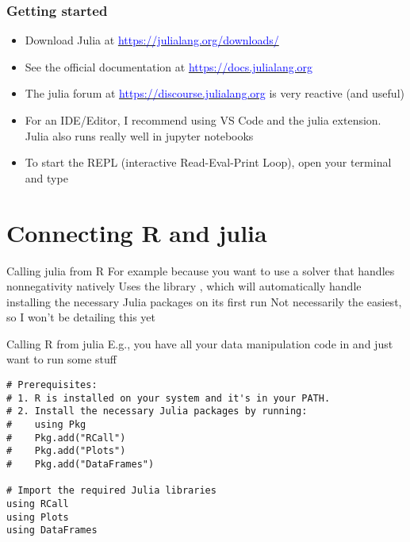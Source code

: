 \documentclass[aspectratio=169]{beamer}\usepackage[]{graphicx}\usepackage[]{xcolor}
\begin{document}
\begin{frame}
  \frametitle{Getting started}
  \begin{itemize}
    \item Download Julia at \href{https://julialang.org/downloads/}{\textcolor{blue}{https://julialang.org/downloads/}}
    \vfill
    \item See the official documentation at \href{https://docs.julialang.org}{\textcolor{blue}{https://docs.julialang.org}}
    \vfill
    \item The julia forum at \href{https://discourse.julialang.org}{\textcolor{blue}{https://discourse.julialang.org}} is very reactive (and useful)
    \vfill
    \item For an IDE/Editor, I recommend using VS Code and the julia extension. Julia also runs really well in jupyter notebooks
    \vfill
    \item To start the REPL (interactive Read-Eval-Print Loop), open your terminal and type 
  \end{itemize}
\end{frame}



\section{Connecting R and julia}


\begin{frame}{Calling julia from R}
For example because you want to use a solver that handles nonnegativity natively
\vfill
Uses the library , which will automatically handle installing the necessary Julia packages on its first run
\vfill
Not necessarily the easiest, so I won't be detailing this yet
\end{frame}


\begin{frame}[fragile]{Calling R from julia}
E.g., you have all your data manipulation code in  and just want to run some stuff
\vfill
\begin{lstlisting}
# Prerequisites:
# 1. R is installed on your system and it's in your PATH.
# 2. Install the necessary Julia packages by running:
#    using Pkg
#    Pkg.add("RCall")
#    Pkg.add("Plots")
#    Pkg.add("DataFrames")

# Import the required Julia libraries
using RCall
using Plots
using DataFrames
\end{lstlisting}
\end{frame}
\end{document}
